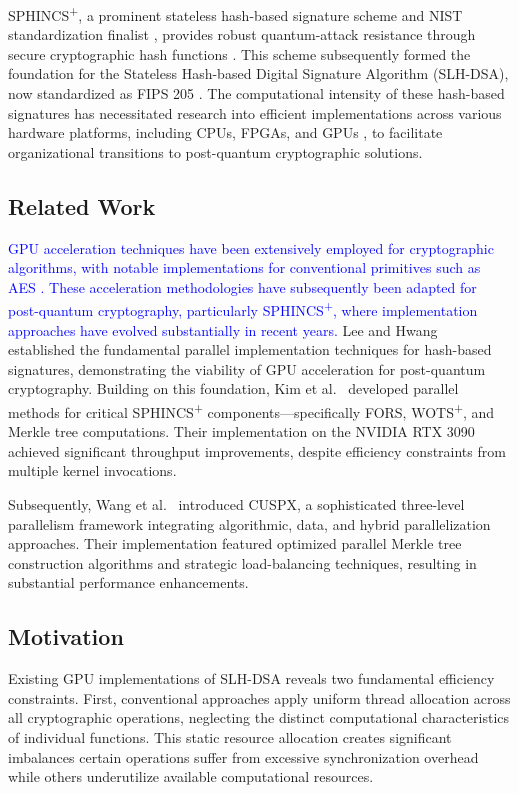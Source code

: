 \documentclass[journal]{IEEEtran}
\begin{document}
SPHINCS\textsuperscript{+}, a prominent stateless hash-based signature scheme and NIST standardization finalist \cite{Yesina}, provides robust quantum-attack resistance through secure cryptographic hash functions \cite{Bernstein2019}. This scheme subsequently formed the foundation for the Stateless Hash-based Digital Signature Algorithm (SLH-DSA), now standardized as FIPS 205 \cite{FIPS205}. The computational intensity of these hash-based signatures has necessitated research into efficient implementations across various hardware platforms, including CPUs, FPGAs, and GPUs \cite{Joseph2022}, to facilitate organizational transitions to post-quantum cryptographic solutions.

\subsection{Related Work}

\textcolor{blue}{GPU acceleration techniques have been extensively employed for cryptographic algorithms, with notable implementations for conventional primitives such as AES \cite{Lee2022a}. These acceleration methodologies have subsequently been adapted for post-quantum cryptography, particularly SPHINCS\textsuperscript{+}, where implementation approaches have evolved substantially in recent years.}
Lee and Hwang~\cite{Lee2022} established the fundamental parallel implementation techniques for hash-based signatures, demonstrating the viability of GPU acceleration for post-quantum cryptography. Building on this foundation, Kim et al.~\cite{Kim2024} developed parallel methods for critical SPHINCS\textsuperscript{+} components—specifically FORS, WOTS\textsuperscript{+}, and Merkle tree computations. Their implementation on the NVIDIA RTX 3090 achieved significant throughput improvements, despite efficiency constraints from multiple kernel invocations.

Subsequently, Wang et al.~\cite{Wang2025} introduced CUSPX, a sophisticated three-level parallelism framework integrating algorithmic, data, and hybrid parallelization approaches. Their implementation featured optimized parallel Merkle tree construction algorithms and strategic load-balancing techniques, resulting in substantial performance enhancements.

\subsection{Motivation}

Existing GPU implementations of SLH-DSA reveals two fundamental efficiency constraints.
First, conventional approaches apply uniform thread allocation across all cryptographic operations, neglecting the distinct computational characteristics of individual functions. This static resource allocation creates significant imbalances certain operations suffer from excessive synchronization overhead while others underutilize available computational resources.
\end{document}
